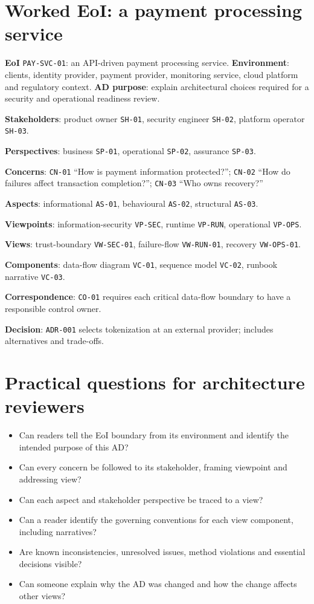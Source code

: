 \documentclass[11pt,letterpaper]{article}
\begin{document}
\section{Worked EoI: a payment processing service}
\begin{Worked}
\textbf{EoI} \texttt{PAY-SVC-01}: an API-driven payment processing service. \textbf{Environment}: clients, identity provider, payment provider, monitoring service, cloud platform and regulatory context. \textbf{AD purpose}: explain architectural choices required for a security and operational readiness review.\par
\textbf{Stakeholders}: product owner \texttt{SH-01}, security engineer \texttt{SH-02}, platform operator \texttt{SH-03}.\par
\textbf{Perspectives}: business \texttt{SP-01}, operational \texttt{SP-02}, assurance \texttt{SP-03}.\par
\textbf{Concerns}: \texttt{CN-01} ``How is payment information protected?''; \texttt{CN-02} ``How do failures affect transaction completion?''; \texttt{CN-03} ``Who owns recovery?''\par
\textbf{Aspects}: informational \texttt{AS-01}, behavioural \texttt{AS-02}, structural \texttt{AS-03}.\par
\textbf{Viewpoints}: information-security \texttt{VP-SEC}, runtime \texttt{VP-RUN}, operational \texttt{VP-OPS}.\par
\textbf{Views}: trust-boundary \texttt{VW-SEC-01}, failure-flow \texttt{VW-RUN-01}, recovery \texttt{VW-OPS-01}.\par
\textbf{Components}: data-flow diagram \texttt{VC-01}, sequence model \texttt{VC-02}, runbook narrative \texttt{VC-03}.\par
\textbf{Correspondence}: \texttt{CO-01} requires each critical data-flow boundary to have a responsible control owner.\par
\textbf{Decision}: \texttt{ADR-001} selects tokenization at an external provider; includes alternatives and trade-offs.
\end{Worked}
\section{Practical questions for architecture reviewers}
\begin{itemize}
\item Can readers tell the EoI boundary from its environment and identify the intended purpose of this AD?
\item Can every concern be followed to its stakeholder, framing viewpoint and addressing view?
\item Can each aspect and stakeholder perspective be traced to a view?
\item Can a reader identify the governing conventions for each view component, including narratives?
\item Are known inconsistencies, unresolved issues, method violations and essential decisions visible?
\item Can someone explain why the AD was changed and how the change affects other views?
\end{itemize}
\LegalFooter
\end{document}
